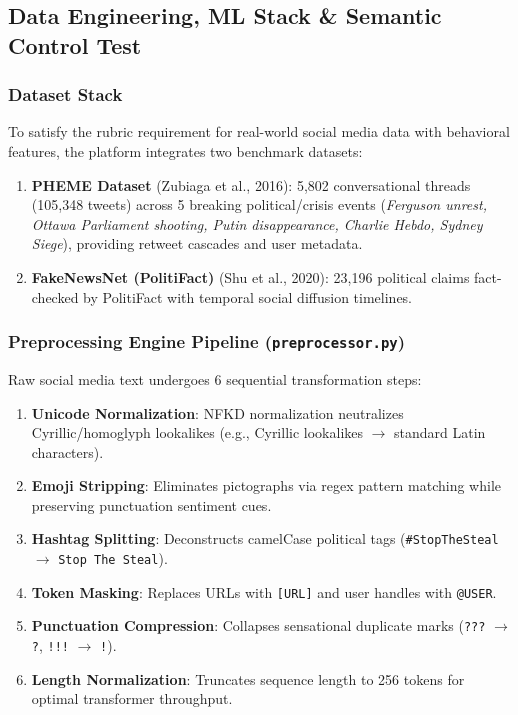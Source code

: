 \documentclass[11pt, a4paper]{article}
\newcommand{\code}[1]{\texttt{\small #1}}
\begin{document}
\subsection{Data Engineering, ML Stack \& Semantic Control Test}

\subsubsection{Dataset Stack}
To satisfy the rubric requirement for real-world social media data with behavioral features, the platform integrates two benchmark datasets:
\begin{enumerate}
  \item \textbf{PHEME Dataset} (Zubiaga et al., 2016): 5,802 conversational threads (105,348 tweets) across 5 breaking political/crisis events (\emph{Ferguson unrest, Ottawa Parliament shooting, Putin disappearance, Charlie Hebdo, Sydney Siege}), providing retweet cascades and user metadata.
  \item \textbf{FakeNewsNet (PolitiFact)} (Shu et al., 2020): 23,196 political claims fact-checked by PolitiFact with temporal social diffusion timelines.
\end{enumerate}

\subsubsection{Preprocessing Engine Pipeline (\code{preprocessor.py})}
Raw social media text undergoes 6 sequential transformation steps:
\begin{enumerate}
  \item \textbf{Unicode Normalization}: NFKD normalization neutralizes Cyrillic/homoglyph lookalikes (e.g., Cyrillic lookalikes $\to$ standard Latin characters).
  \item \textbf{Emoji Stripping}: Eliminates pictographs via regex pattern matching while preserving punctuation sentiment cues.
  \item \textbf{Hashtag Splitting}: Deconstructs camelCase political tags (\code{\#StopTheSteal} $\to$ \code{Stop The Steal}).
  \item \textbf{Token Masking}: Replaces URLs with \code{[URL]} and user handles with \code{@USER}.
  \item \textbf{Punctuation Compression}: Collapses sensational duplicate marks (\code{???} $\to$ \code{?}, \code{!!!} $\to$ \code{!}).
  \item \textbf{Length Normalization}: Truncates sequence length to 256 tokens for optimal transformer throughput.
\end{enumerate}
\end{document}
